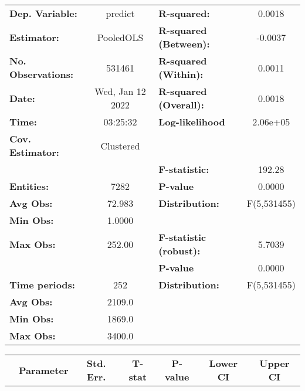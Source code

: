 \begin{center}
\begin{tabular}{lclc}
\toprule
\textbf{Dep. Variable:}    &      predict       & \textbf{  R-squared:         }   &      0.0018      \\
\textbf{Estimator:}        &     PooledOLS      & \textbf{  R-squared (Between):}  &     -0.0037      \\
\textbf{No. Observations:} &       531461       & \textbf{  R-squared (Within):}   &      0.0011      \\
\textbf{Date:}             &  Wed, Jan 12 2022  & \textbf{  R-squared (Overall):}  &      0.0018      \\
\textbf{Time:}             &      03:25:32      & \textbf{  Log-likelihood     }   &     2.06e+05     \\
\textbf{Cov. Estimator:}   &     Clustered      & \textbf{                     }   &                  \\
\textbf{}                  &                    & \textbf{  F-statistic:       }   &      192.28      \\
\textbf{Entities:}         &        7282        & \textbf{  P-value            }   &      0.0000      \\
\textbf{Avg Obs:}          &       72.983       & \textbf{  Distribution:      }   &   F(5,531455)    \\
\textbf{Min Obs:}          &       1.0000       & \textbf{                     }   &                  \\
\textbf{Max Obs:}          &       252.00       & \textbf{  F-statistic (robust):} &      5.7039      \\
\textbf{}                  &                    & \textbf{  P-value            }   &      0.0000      \\
\textbf{Time periods:}     &        252         & \textbf{  Distribution:      }   &   F(5,531455)    \\
\textbf{Avg Obs:}          &       2109.0       & \textbf{                     }   &                  \\
\textbf{Min Obs:}          &       1869.0       & \textbf{                     }   &                  \\
\textbf{Max Obs:}          &       3400.0       & \textbf{                     }   &                  \\
\bottomrule
\end{tabular}
\begin{tabular}{lcccccc}
                & \textbf{Parameter} & \textbf{Std. Err.} & \textbf{T-stat} & \textbf{P-value} & \textbf{Lower CI} & \textbf{Upper CI}  \\

\end{tabular}
\end{center}
